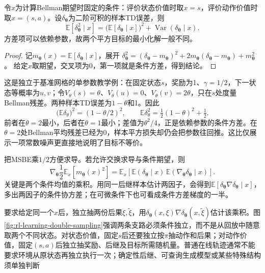 \begin{theorem}[样本平方误差的条件方差分解]
  \label{thm:rl-learning-td-variance}
  令$x$为计算Bellman期望时固定的条件：评价状态价值时取$x=s$，评价动作价值时取$x=(s,a)$。设$\delta_{\bm{\theta}}$为二阶可积的样本TD误差，则
  \begin{equation}
    \mathbb E[\delta_{\bm{\theta}}^2\mid x]
      =\bigl(\mathbb E[\delta_{\bm{\theta}}\mid x]\bigr)^2
          +\operatorname{Var}(\delta_{\bm{\theta}}\mid x).
    \label{eq:rl-learning-td-variance}
  \end{equation}
  方差项可以依赖参数，故两个平方目标的最小化解一般不同。
\end{theorem}
\begin{proof}
  记$m_{\bm{\theta}}(x)=\mathbb E[\delta_{\bm{\theta}}\mid x]$，展开
  $\delta_{\bm{\theta}}^2=(\delta_{\bm{\theta}}-m_{\bm{\theta}})^2
    +2m_{\bm{\theta}}(\delta_{\bm{\theta}}-m_{\bm{\theta}})
    +m_{\bm{\theta}}^2$。
  给定$x$取期望，交叉项为0，第一项就是条件方差，得到结论。
\end{proof}

\begin{example}[两个后继使最优参数改变]
  \label{ex:rl-learning-double-sampling}
  这是独立于基准网格的单参数教学例：在固定状态$s$，奖励为1、$\gamma=1/2$，下一状态等概率为$u,v$；令$V_\theta(s)=\theta$、$V_\theta(u)=0$、$V_\theta(v)=2\theta$，只在$s$处度量Bellman残差。两种样本TD误差为$1-\theta$和1。因此
  \[
    \bigl(\mathbb E\delta_\theta\bigr)^2=(1-\theta/2)^2,\qquad
    \mathbb E\delta_\theta^2=\tfrac12(1-\theta)^2+\tfrac12.
  \]
  前者在$\theta=2$最小，后者在$\theta=1$最小；差值为$\theta^2/4$，正是依赖参数的条件方差。在$\theta=2$处Bellman平均残差已经为0，样本平方损失却仍会把参数往回推。这比仅展示一项常数噪声更直接地说明了目标不等价。
\end{example}

把MSBE乘$1/2$方便求导。若允许交换求导与条件期望，则
\begin{equation}
  \nabla_{\bm{\theta}}\frac12\mathbb E_x[m_{\bm{\theta}}(x)^2]
    =\mathbb E_x\!\left[
        \mathbb E(\delta_{\bm{\theta}}\mid x)\,
        \mathbb E(\nabla_{\bm{\theta}}\delta_{\bm{\theta}}\mid x)
      \right].
  \label{eq:rl-learning-msbe-gradient}
\end{equation}
关键是两个条件均值的乘积。用同一后继样本估计两因子，会得到$\mathbb E[\delta_{\bm{\theta}}\nabla\delta_{\bm{\theta}}\mid x]$，多出两因子的条件协方差；在可微条件下也可看成条件方差梯度的一半。

要求给定同一个$x$后，独立抽两份后果$\xi,\widetilde\xi$，用$\delta_{\bm{\theta}}(x,\xi)\nabla\delta_{\bm{\theta}}(x,\widetilde\xi)$估计该乘积。图\ref{fig:rl-learning-double-sampling}强调两条支路必须条件独立，而不是从回放中随意取两个不同状态。对状态价值，固定$s$后还要独立按$\pi$抽动作和后果；对动作价值，固定$(s,a)$后独立抽奖励、后继及目标所需随机量。普通在线轨迹通常不能要求环境从原状态再独立执行一次；确定性后继、可查询生成模型或某些特殊结构须单独判断


